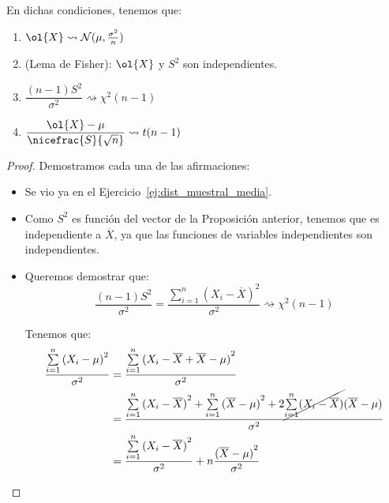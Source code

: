 \begin{coro}\label{cor:muestreo_1normal}
    En dichas condiciones, tenemos que:
    \begin{enumerate}
        \item $\ol{X}\rightsquigarrow \cc{N}(\mu, \frac{\sigma^2}{n})$
        \item (Lema de Fisher): $\ol{X}$ y $S^2$ son independientes.
        \item $\dfrac{(n-1)S^2}{\sigma^2}\rightsquigarrow \chi^2(n-1)$
        \item $\dfrac{\ol{X}-\mu}{\nicefrac{S}{\sqrt{n}}}\rightsquigarrow t(n-1)$
    \end{enumerate}
\begin{proof}
    Demostramos cada una de las afirmaciones:
    \begin{itemize}
        \item Se vio ya en el Ejercicio~\ref{ej:dist_muestral_media}.
        \item Como $S^2$ es función del vector de la Proposición anterior, tenemos que es independiente a $\overline{X}$, ya que las funciones de variables independientes son independientes.
        \item Queremos demostrar que:
            \begin{equation*}
                \dfrac{(n-1)S^2}{\sigma^2} = \dfrac{\sum\limits_{i=1}^n {(X_i - \overline{X})}^{2}}{\sigma^2} \rightsquigarrow\chi^2(n-1)
            \end{equation*}
            
            Tenemos que:
            \begin{align*}
                \dfrac{\sum\limits_{i=1}^n {(X_i - \mu)}^{2}}{\sigma^2} &= \dfrac{\sum\limits_{i=1}^n{(X_i - \overline{X} + \overline{X} - \mu)}^{2}}{\sigma^2} \\ 
                &= \dfrac{\sum\limits_{i=1}^n {(X_i - \overline{X})}^{2} + \sum\limits_{i=1}^n {(\overline{X}-\mu)}^{2} + 2\cancel{\sum\limits_{i=1}^n (X_i - \overline{X})}(\overline{X} - \mu)}{\sigma^2} \\
                &= \dfrac{\sum\limits_{i=1}^n {(X_i - \overline{X})}^{2} }{\sigma^2} + n \dfrac{{(\overline{X}-\mu)}^{2}}{\sigma^2}
            \end{align*}


\end{itemize}
\end{proof}
\end{coro}
